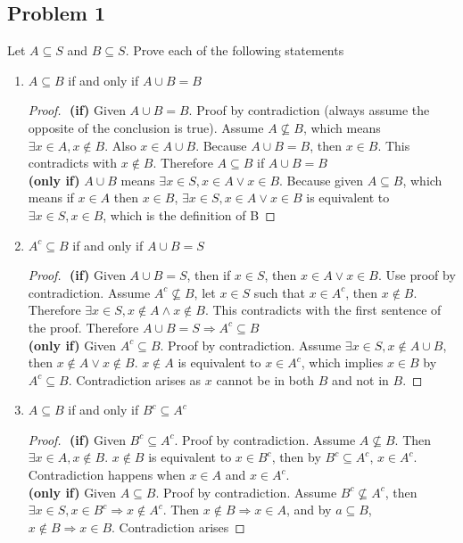 \documentclass[11pt]{article}
\begin{document}
\subsection*{Problem 1}
Let $A\subseteq S$ and $B\subseteq S$. Prove each of the following statements \\
\begin{enumerate}
  \item $A\subseteq B$ if and only if $A\cup B = B$
    \begin{proof}
      $ $\newline
      \textbf{(if)} Given $A\cup B = B$. Proof by contradiction (always assume the opposite of the conclusion is true). Assume $A\not\subseteq B$, which means $\exists x \in A, x \not\in B$. Also $x\in A\cup B$. Because $A\cup B = B$, then $x\in B$. This contradicts with $x\not\in B$. Therefore $A\subseteq B$ if $A\cup B = B$ \\
      \textbf{(only if)}  $A\cup B$ means $\exists x\in S, x\in A \lor x\in B$. Because given $A\subseteq B$, which means if $x\in A$ then $x\in B$, $\exists x\in S, x\in A \lor x\in B$ is equivalent to $\exists x\in S, x\in B$, which is the definition of B
    \end{proof}
  \item $A^{c}\subseteq B$ if and only if $A\cup B = S$
    \begin{proof}
      $ $\newline
      \textbf{(if)} Given $A\cup B = S$, then if $x\in S$, then $x\in A \lor x\in B$. Use proof by contradiction. Assume $A^{c}\not\subseteq B$, let $x \in S$ such that $x \in A^c$, then $x\not\in B$. Therefore $\exists x\in S, x\not\in A \land x\not\in B$. This contradicts with the first sentence of the proof. Therefore $A\cup B = S \Rightarrow A^{c}\subseteq B$ \\
      \textbf{(only if)} Given $A^{c}\subseteq B$. Proof by contradiction. Assume $\exists x \in S, x\not\in A\cup B$, then $x\not\in A \lor x\not\in B$. $x\not\in A$ is equivalent to $x\in A^{c}$, which implies $x\in B$ by $A^{c}\subseteq B$. Contradiction arises as $x$ cannot be in both $B$ and not in $B$.
    \end{proof}

  \item $A\subseteq B$ if and only if $B^{c}\subseteq A^{c}$
    \begin{proof}
      $ $\newline
      \textbf{(if)}
      Given $B^{c}\subseteq A^{c}$. Proof by contradiction. Assume $A \not\subseteq B$. Then $\exists x\in A, x \not\in B$. $x\not\in B$ is equivalent to $x\in B^c$, then by  $B^{c}\subseteq A^{c}$, $x \in A^c$. Contradiction happens when $x\in A$ and $x\in A^c$. \\
      \textbf{(only if)}
      Given $A\subseteq B$. Proof by contradiction. Assume $B^{c}\not\subseteq A^{c}$, then $\exists x\in S, x\in B^c \Rightarrow x\not\in A^c$. Then $x\not\in B \Rightarrow x\in A$, and by $a\subseteq B$, $x\not\in B \Rightarrow x\in B$. Contradiction arises
    \end{proof}


\end{enumerate}
\end{document}
